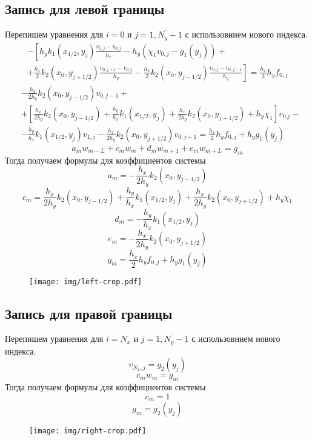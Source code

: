 \subsection{Запись для левой границы}
Перепишем уравнения для $i = 0$ и $j = \overline{1,N_y-1}$ с использовнием нового индекса.
\begin{multline*}
    - \left[
    h_y k_1(x_{1/2},y_{j}) \frac{v_{1,j} - v_{0,j}}{h_x} - h_y \left( \chi_1 v_{0,j} - g_1(y_{j}) \right) + \right. \\
    \left. +
    \frac{h_x}{2} k_2(x_{0},y_{j+1/2}) \frac{v_{0,j+1} - v_{0,j}}{h_y} - \frac{h_x}{2} k_2(x_{0},y_{j-1/2}) \frac{v_{0,j} - v_{0,j-1}}{h_y}
    \right] =
    \frac{h_x}{2} h_y f_{0,j}
\end{multline*}
\[
\begin{split}
    &-\frac{h_x}{2 h_y} k_2(x_{0},y_{j-1/2}) v_{0,j-1} +\\
    &+\left[ \frac{h_x}{2 h_y} k_2(x_{0},y_{j-1/2}) + \frac{h_y}{h_x} k_1(x_{1/2},y_{j}) + \frac{h_x}{2 h_y} k_2(x_{0},y_{j+1/2}) + h_y \chi_1 \right] v_{0.j} - \\
    &-\frac{h_y}{h_x} k_1(x_{1/2},y_{j}) v_{1,j} - \frac{h_x}{2 h_y} k_2(x_{0},y_{j+1/2}) v_{0,j+1} = \frac{h_x}{2} h_y f_{0,j} + h_y g_1(y_j)
\end{split}
\]
\[ a_m w_{m - L} + c_m w_m + d_m w_{m + 1} + e_m w_{m + L} = g_m \]
Тогда получаем формулы для коэффициентов системы
\[ a_m = -\frac{h_x}{2 h_y} k_2(x_{0},y_{j-1/2}) \]
\[ c_m = \frac{h_x}{2 h_y} k_2(x_{0},y_{j-1/2}) + \frac{h_y}{h_x} k_1(x_{1/2},y_{j}) + \frac{h_x}{2 h_y} k_2(x_{0},y_{j+1/2}) + h_y \chi_1 \]
\[ d_m = -\frac{h_y}{h_x} k_1(x_{1/2},y_{j}) \]
\[ e_m = -\frac{h_x}{2 h_y} k_2(x_{0},y_{j+1/2}) \]
\[ g_m = \frac{h_x}{2} h_y f_{0,j} + h_y g_1(y_j) \]
\begin{figure}[H]
    \centering
    \texttt{[image: img/left-crop.pdf]}
\end{figure}

\subsection{Запись для правой границы}
Перепишем уравнения для $i = N_x$ и $j = \overline{1,N_y-1}$ с использовнием нового индекса.
\[ v_{N_x,j} = g_2(y_j) \]
\[ c_m w_m = g_m \]
Тогда получаем формулы для коэффициентов системы
\[ c_m = 1 \]
\[ g_m = g_2(y_j) \]
\begin{figure}[H]
    \centering
    \texttt{[image: img/right-crop.pdf]}
\end{figure}

